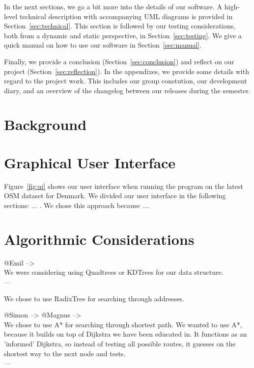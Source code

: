 \documentclass[11pt]{article}
\begin{document}
In the next sections, we go a bit more into the details of our software. A high-level technical description with accompanying UML diagrams is provided in Section~\ref{sec:technical}. This section is followed by our testing considerations, both from a dynamic and static perspective, in Section~\ref{sec:testing}. We give a quick manual on how to use our software in Section~\ref{sec:manual}.

Finally, we provide a conclusion (Section~\ref{sec:conclusion}) and reflect on our project (Section~\ref{sec:reflection}). In the appendixes, we provide some details with regard to the project work. This includes our group constution, our development diary, and an overview of the changelog between our releases during the semester.

\section{Background}\label{sec:background}

\section{Graphical User Interface}\label{sec:ui}


Figure~\ref{fig:ui} shows our user interface when running the program on the latest OSM dataset for Denmark. We divided our user interface in the following sections: ... . We chose this approach because ....

\section{Algorithmic Considerations}\label{sec:algorithms}
@Emil --> \\
We were considering using Quadtrees or KDTrees for our data structure. \\
---

We chose to use RadixTree for searching through addresses.

@Simon --> @Magnus --> \\
We chose to use A* for searching through shortest path. We wanted to use A*, because it builds on top of Dijkstra we have been educated in. It functions as an 'informed' Dijkstra, so instead of testing all possible routes, it guesses on the shortest way to the next node and tests.\\
---
\end{document}
